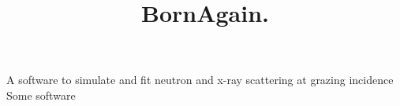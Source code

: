\documentclass[a4paper,10pt]{article}
\title{BornAgain. }
\author{}
\begin{document}
A software to simulate and fit neutron and x-ray scattering at grazing incidence
Some software








\end{document}
